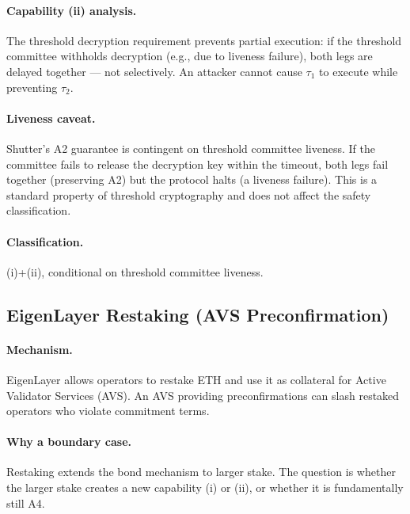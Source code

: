 \paragraph{Capability (ii) analysis.}
The threshold decryption requirement prevents partial execution: if the
threshold committee withholds decryption (e.g., due to liveness failure), both
legs are delayed together --- not selectively. An attacker cannot cause $\tau_1$
to execute while preventing $\tau_2$.

\paragraph{Liveness caveat.}
Shutter's A2 guarantee is contingent on threshold committee liveness. If the
committee fails to release the decryption key within the timeout, both legs
fail together (preserving A2) but the protocol halts (a liveness failure). This
is a standard property of threshold cryptography and does not affect the safety
classification.

\paragraph{Classification.} (i)+(ii), conditional on threshold committee liveness.

\subsection{EigenLayer Restaking (AVS Preconfirmation)}
\label{app:eigenlayer}

\paragraph{Mechanism.}
EigenLayer allows operators to restake ETH and use it as collateral for Active
Validator Services (AVS). An AVS providing preconfirmations can slash restaked
operators who violate commitment terms.

\paragraph{Why a boundary case.}
Restaking extends the bond mechanism to larger stake. The question is whether
the larger stake creates a new capability (i) or (ii), or whether it is
fundamentally still A4.

